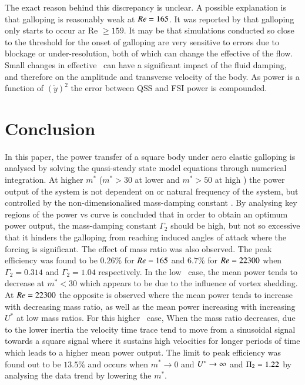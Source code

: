 The exact reason behind this discrepancy is unclear. A possible explanation is that galloping is reasonably weak at $Re=165$.  It was reported by \cite{Barrero-Gil2009} that galloping only starts to occur ar Re $\geq 159$. It may be that simulations conducted so close to the threshold for the onset of galloping are very sensitive to errors due to blockage or under-resolution, both of which can change the effective \reynoldsnumber of the flow. Small changes in effective \reynoldsnumber\ can have a significant impact of the fluid damping, and therefore on the amplitude and transverse velocity of the body. As power is a function of $(\dot{y})^2$ the error between QSS and FSI power is compounded.

\section{Conclusion}
\label{sec:conc}

In this paper, the power transfer of a square body under aero elastic galloping is analysed by solving the quasi-steady state model equations through numerical integration. At higher $m^*$ ($m^*>30$ at lower \reynoldsnumber and $m^*> 50$ at high \reynoldsnumber) the power output of the system is not dependent on \ustar or natural frequency of the system, but controlled by the non-dimensionalised mass-damping constant \massdamp . By analysing key regions of the power vs \ustar curve is concluded that in order to obtain an optimum power output, the mass-damping constant $\Gamma_2$ should be high, but not so excessive that it hinders the galloping from reaching induced angles of attack where the forcing is significant. The effect of mass ratio was also observed. The peak efficiency was found to be $0.26\%$ for $Re=165$ and $6.7\%$ for $Re=22300$  when $\Gamma_2=0.314$ and $\Gamma_2=1.04$ respectively. In the low \reynoldsnumber\ case, the mean power tends to decrease at $m^*<30$ which appears to be due to the influence of vortex shedding. At $Re=22300$ the opposite is observed where the mean power tends to increase with decreasing mass ratio, as well as the mean power increasing with increasing $U^*$ at low mass ratios. For this higher \reynoldsnumber\ case, When the mass ratio decreases, due to the lower inertia the velocity time trace tend to move from a sinusoidal signal towards a square signal where it sustains high velocities for longer periods of time which leads to a higher mean power output. The limit to peak efficiency was found out to be $13.5\%$ and occurs when $m^*\rightarrow 0$ and $U^{*} \rightarrow \infty$ and $\Pi_2=1.22$ by analysing the data trend by lowering the $m^*$.


